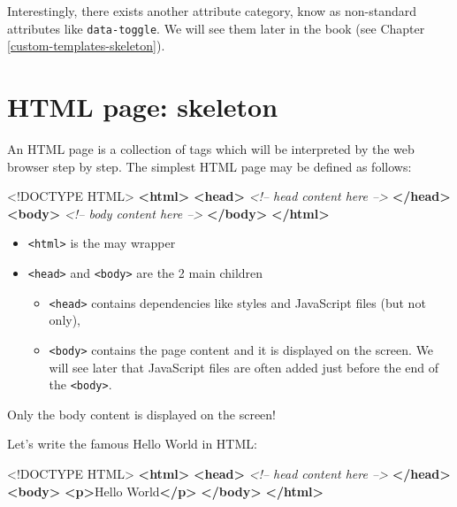 \documentclass[]{book}
\newenvironment{Shaded}{\begin{snugshade}}{\end{snugshade}}
\newcommand{\CommentTok}[1]{\textcolor[rgb]{0.56,0.35,0.01}{\textit{#1}}}
\newcommand{\DataTypeTok}[1]{\textcolor[rgb]{0.13,0.29,0.53}{#1}}
\newcommand{\KeywordTok}[1]{\textcolor[rgb]{0.13,0.29,0.53}{\textbf{#1}}}
\newcommand{\NormalTok}[1]{#1}
\providecommand{\tightlist}{%
  \setlength{\itemsep}{0pt}\setlength{\parskip}{0pt}}
\begin{document}
Interestingly, there exists another attribute category, know as non-standard attributes like \texttt{data-toggle}. We will see them later in the book (see Chapter \ref{custom-templates-skeleton}).

\hypertarget{html-page-skeleton}{%
\section{HTML page: skeleton}\label{html-page-skeleton}}

An HTML page is a collection of tags which will be interpreted by the web browser step by step. The simplest HTML page may be defined as follows:

\begin{Shaded}
\begin{Highlighting}[]
\DataTypeTok{<!DOCTYPE }\NormalTok{HTML}\DataTypeTok{>}
\KeywordTok{<html>}
  \KeywordTok{<head>}
  \CommentTok{<!-- head content here -->}
  \KeywordTok{</head>}
  \KeywordTok{<body>}
  \CommentTok{<!-- body content here -->}
  \KeywordTok{</body>}
\KeywordTok{</html>}
\end{Highlighting}
\end{Shaded}

\begin{itemize}
\tightlist
\item
  \texttt{\textless{}html\textgreater{}} is the may wrapper
\item
  \texttt{\textless{}head\textgreater{}} and \texttt{\textless{}body\textgreater{}} are the 2 main children

  \begin{itemize}
  \tightlist
  \item
    \texttt{\textless{}head\textgreater{}} contains dependencies like styles and JavaScript files (but not only),
  \item
    \texttt{\textless{}body\textgreater{}} contains the page content and it is displayed on the screen. We will see later that JavaScript files are often added just before the end of the \texttt{\textless{}body\textgreater{}}.
  \end{itemize}
\end{itemize}

Only the body content is displayed on the screen!

Let's write the famous Hello World in HTML:

\begin{Shaded}
\begin{Highlighting}[]
\DataTypeTok{<!DOCTYPE }\NormalTok{HTML}\DataTypeTok{>}
\KeywordTok{<html>}
  \KeywordTok{<head>}
  \CommentTok{<!-- head content here -->}
  \KeywordTok{</head>}
  \KeywordTok{<body>}
  \KeywordTok{<p>}\NormalTok{Hello World}\KeywordTok{</p>}
  \KeywordTok{</body>}
\KeywordTok{</html>}
\end{Highlighting}
\end{Shaded}
\end{document}
